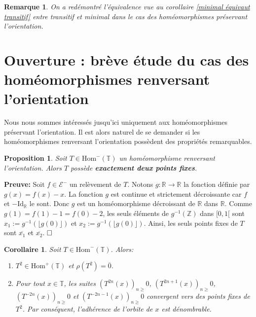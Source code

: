 \documentclass[11pt,a4 paper]{article}
\newtheorem{propriete}[theoreme]{Proposition}
\newtheorem{corollaire}[theoreme]{Corollaire}
\newtheorem{rmq}[theoreme]{Remarque}
\newcommand{\Tbb}{\mathbb{T}}
\newcommand{\Rbb}{\mathbb{R}}
\newcommand{\Ec}{\mathcal{E}}
\newcommand{\Id}{\mathrm{Id}}
\newcommand{\HomT}{\mathrm{Hom}^+(\Tbb)}
\newcommand{\HommoinsT}{\mathrm{Hom}^-(\Tbb)}
\newenvironment{coro}{\begin{box_coro}\begin{corollaire}}{\end{corollaire}\end{box_coro}}
\newenvironment{ppt}{\begin{box_ppt}\begin{propriete}}{\end{propriete}\end{box_ppt}}
\begin{document}
	\begin{rmq}
		On a redémontré l'équivalence vue au corollaire \ref{minimal équivaut transitif} entre transitif et minimal dans le cas des homéomorphismes préservant l'orientation.
	\end{rmq}












\newpage
\section{Ouverture : brève étude du cas des homéomorphismes renversant l'orientation}
	Nous nous sommes intéressés jusqu'ici uniquement aux homéomorphismes préservant l'orientation. Il est alors naturel de se demander si les homéomorphismes renversant l'orientation possèdent des propriétés remarquables.\\
	
	
\begin{ppt}
		Soit $T\in \HommoinsT$ un homéomorphisme renversant l'orientation. Alors $T$ possède \textbf{exactement deux points fixes}.
\end{ppt}

	\textbf{Preuve:}
	Soit $f \in \Ec^-$ un relèvement de $T$. Notons $g: \Rbb \to \Rbb$ la fonction définie par $g(x)=f(x)-x$. La fonction $g$ est continue et strictement décroissante car $f$ et $-\Id_{\Rbb}$ le sont. Donc $g$ est un homéomorphisme décroissant de $\Rbb$ dans $\Rbb$. Comme $g(1)=f(1)-1=f(0)-2$, les seuls éléments de $g^{-1}(\mathbb{Z})$ dans $[0,1[$ sont $x_1:=g^{-1}(\lfloor g(0) \rfloor)$ et $x_2:=g^{-1}(\lfloor g(0) \rfloor)$. Ainsi, les seuls points fixes de $T$ sont $\overline{x_1}$ et $\overline{x_2}$. $\hfill \square$\\
	
	
	
	
	
\begin{coro}
	Soit $T \in \HommoinsT$. Alors:
	\begin{enumerate}
		\item $T^2 \in \HomT$ et $\rho(T^2)=\overline{0}$.
		\item Pour tout $x \in \Tbb$, les suites $(T^{2n}(x))_{n\geq}0$, $(T^{2n+1}(x))_{n\geq}0$, $(T^{-2n}(x))_{n\geq}0$ et $(T^{-2n-1}(x))_{n\geq}0$ convergent vers des points fixes de $T^2$. Par conséquent, l'adhérence de l'orbite de $x$ est dénombrable.
	\end{enumerate}
\end{coro}
\end{document}
